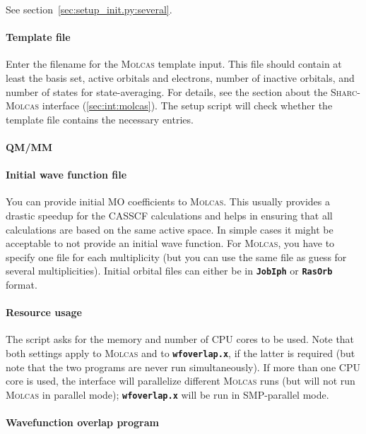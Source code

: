 \documentclass[a4paper,10pt,DIV=15,openany,twoside=false]{scrbook}
\newcommand{\sharc}{\textsc{Sharc}}
\newcommand{\todo}[1]{\textcolor{RL}{#1}}
\newcommand{\ttt}[1]{\textbf{\texttt{#1}}}
\begin{document}
See section~\ref{sec:setup_init.py:several}.

\paragraph{Template file}

Enter the filename for the \textsc{Molcas} template input. This file should contain at least the basis set, active orbitals and electrons, number of inactive orbitals, and number of states for state-averaging. For details, see the section about the \sharc-\textsc{Molcas} interface (\ref{sec:int:molcas}). The setup script will check whether the template file contains the necessary entries. 

\paragraph{\todo{QM/MM}}

\paragraph{Initial wave function file}

You can provide initial MO coefficients to \textsc{Molcas}. This usually provides a drastic speedup for the CASSCF calculations and helps in ensuring that all calculations are based on the same active space. In simple cases it might be acceptable to not provide an initial wave function. For \textsc{Molcas}, you have to specify one file for each multiplicity (but you can use the same file as guess for several multiplicities).
Initial orbital files can either be in \ttt{JobIph} or \ttt{RasOrb} format.

\paragraph{Resource usage}

The script asks for the memory and number of CPU cores to be used. Note that both settings apply to \textsc{Molcas} and to \ttt{wfoverlap.x}, if the latter is required (but note that the two programs are never run simultaneously).
If more than one CPU core is used, the interface will parallelize different \textsc{Molcas} runs (but will not run \textsc{Molcas} in parallel mode); \ttt{wfoverlap.x} will be run in SMP-parallel mode.

\paragraph{Wavefunction overlap program}
\end{document}
